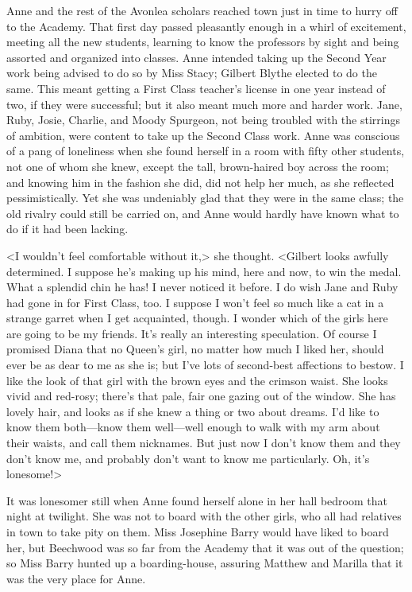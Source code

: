 Anne and the rest of the Avonlea scholars reached town just in time to hurry off to the Academy. That first day passed pleasantly enough in a whirl of excitement, meeting all the new students, learning to know the professors by sight and being assorted and organized into classes. Anne intended taking up the Second Year work being advised to do so by Miss Stacy; Gilbert Blythe elected to do the same. This meant getting a First Class teacher's license in one year instead of two, if they were successful; but it also meant much more and harder work. Jane, Ruby, Josie, Charlie, and Moody Spurgeon, not being troubled with the stirrings of ambition, were content to take up the Second Class work. Anne was conscious of a pang of loneliness when she found herself in a room with fifty other students, not one of whom she knew, except the tall, brown-haired boy across the room; and knowing him in the fashion she did, did not help her much, as she reflected pessimistically. Yet she was undeniably glad that they were in the same class; the old rivalry could still be carried on, and Anne would hardly have known what to do if it had been lacking.

<I wouldn't feel comfortable without it,> she thought. <Gilbert looks awfully determined. I suppose he's making up his mind, here and now, to win the medal. What a splendid chin he has! I never noticed it before. I do wish Jane and Ruby had gone in for First Class, too. I suppose I won't feel so much like a cat in a strange garret when I get acquainted, though. I wonder which of the girls here are going to be my friends. It's really an interesting speculation. Of course I promised Diana that no Queen's girl, no matter how much I liked her, should ever be as dear to me as she is; but I've lots of second-best affections to bestow. I like the look of that girl with the brown eyes and the crimson waist. She looks vivid and red-rosy; there's that pale, fair one gazing out of the window. She has lovely hair, and looks as if she knew a thing or two about dreams. I'd like to know them both—know them well—well enough to walk with my arm about their waists, and call them nicknames. But just now I don't know them and they don't know me, and probably don't want to know me particularly. Oh, it's lonesome!>

It was lonesomer still when Anne found herself alone in her hall bedroom that night at twilight. She was not to board with the other girls, who all had relatives in town to take pity on them. Miss Josephine Barry would have liked to board her, but Beechwood was so far from the Academy that it was out of the question; so Miss Barry hunted up a boarding-house, assuring Matthew and Marilla that it was the very place for Anne.

